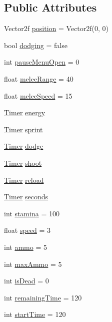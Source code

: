 \subsection*{Public Attributes}
\begin{DoxyCompactItemize}
\item 
Vector2f \hyperlink{struct_player_stats_a69d3f79697de6ab61e0e623bcc2149d7}{position} = Vector2f(0, 0)
\item 
bool \hyperlink{struct_player_stats_a407c02f77b9057c2dc2405fda01ffc10}{dodging} = false
\item 
int \hyperlink{struct_player_stats_a8290edfa2a4f9c07952a463a2130b854}{pause\+Menu\+Open} = 0
\item 
float \hyperlink{struct_player_stats_a4f410ca507dc427d07216c4d9f5c72b4}{melee\+Range} = 40
\item 
float \hyperlink{struct_player_stats_a42bf3bb543b6a0b2795e2da227f61a8f}{melee\+Speed} = 15
\item 
\hyperlink{struct_timer}{Timer} \hyperlink{struct_player_stats_ae27c978afce4840051663616408251ea}{energy}
\item 
\hyperlink{struct_timer}{Timer} \hyperlink{struct_player_stats_a22cc49283aedec58d7ff532dc50e1541}{sprint}
\item 
\hyperlink{struct_timer}{Timer} \hyperlink{struct_player_stats_a55071f370b68104e5ee0c3d56ee6e9a4}{dodge}
\item 
\hyperlink{struct_timer}{Timer} \hyperlink{struct_player_stats_a261129c34a506778d0b83ed5857263b6}{shoot}
\item 
\hyperlink{struct_timer}{Timer} \hyperlink{struct_player_stats_a0f20347dec48b0df3ab77156b9535063}{reload}
\item 
\hyperlink{struct_timer}{Timer} \hyperlink{struct_player_stats_ac30ff0f8390f54929be9f378cd759c81}{seconds}
\item 
int \hyperlink{struct_player_stats_abfb2168c91b0bbcf5a0b996b0bf7d1c7}{stamina} = 100
\item 
float \hyperlink{struct_player_stats_a19d6791dea891e37558e940dc486fef4}{speed} = 3
\item 
int \hyperlink{struct_player_stats_a2600a3f6f284a3eeddcc080953e90dfa}{ammo} = 5
\item 
int \hyperlink{struct_player_stats_afbfb80a6992ad7a4627e62ce89b20a10}{max\+Ammo} = 5
\item 
int \hyperlink{struct_player_stats_a8a20827747238fa6322e7d79a4f46f51}{is\+Dead} = 0
\item 
int \hyperlink{struct_player_stats_a42b7d05fe86a26230ff2b55bbe0489ad}{remaining\+Time} = 120
\item 
int \hyperlink{struct_player_stats_ad58078805e9b2f5978639b2aa7447e81}{start\+Time} = 120
\end{DoxyCompactItemize}


